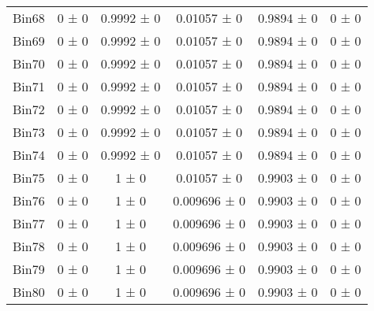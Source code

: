 \begin{tabular}{@{\extracolsep{4pt}}lccccc@{}}
     Bin68 & 0 ± 0 & 0.9992 ± 0 & 0.01057 ± 0 & 0.9894 ± 0 & 0 ± 0 \\ 
     Bin69 & 0 ± 0 & 0.9992 ± 0 & 0.01057 ± 0 & 0.9894 ± 0 & 0 ± 0 \\ 
     Bin70 & 0 ± 0 & 0.9992 ± 0 & 0.01057 ± 0 & 0.9894 ± 0 & 0 ± 0 \\ 
     Bin71 & 0 ± 0 & 0.9992 ± 0 & 0.01057 ± 0 & 0.9894 ± 0 & 0 ± 0 \\ 
     Bin72 & 0 ± 0 & 0.9992 ± 0 & 0.01057 ± 0 & 0.9894 ± 0 & 0 ± 0 \\ 
     Bin73 & 0 ± 0 & 0.9992 ± 0 & 0.01057 ± 0 & 0.9894 ± 0 & 0 ± 0 \\ 
     Bin74 & 0 ± 0 & 0.9992 ± 0 & 0.01057 ± 0 & 0.9894 ± 0 & 0 ± 0 \\ 
     Bin75 & 0 ± 0 & 1 ± 0 & 0.01057 ± 0 & 0.9903 ± 0 & 0 ± 0 \\ 
     Bin76 & 0 ± 0 & 1 ± 0 & 0.009696 ± 0 & 0.9903 ± 0 & 0 ± 0 \\ 
     Bin77 & 0 ± 0 & 1 ± 0 & 0.009696 ± 0 & 0.9903 ± 0 & 0 ± 0 \\ 
     Bin78 & 0 ± 0 & 1 ± 0 & 0.009696 ± 0 & 0.9903 ± 0 & 0 ± 0 \\ 
     Bin79 & 0 ± 0 & 1 ± 0 & 0.009696 ± 0 & 0.9903 ± 0 & 0 ± 0 \\ 
     Bin80 & 0 ± 0 & 1 ± 0 & 0.009696 ± 0 & 0.9903 ± 0 & 0 ± 0 \\ 
\hline\hline
  \end{tabular}
